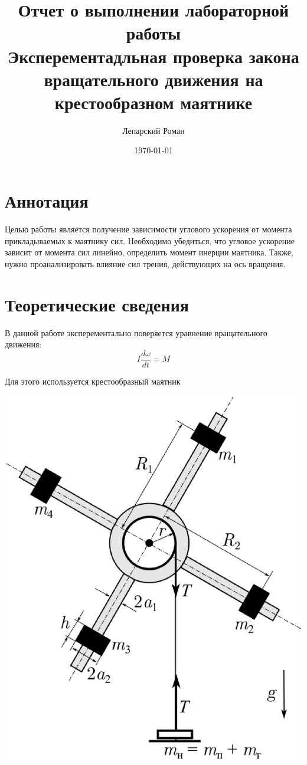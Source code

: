 \documentclass[a4paper, 12pt]{article}
\title{Отчет о выполнении лабораторной работы \\ Эксперементадльная проверка закона вращательного движения на крестообразном маятнике}
\author{Лепарский Роман}
\date{\today}
\begin{document}
\maketitle

\newpage

\section{Аннотация}

Целью работы является получение зависимости углового ускорения от момента прикладываемых к маятнику сил. Необходимо убедиться, что угловое ускорение зависит от момента сил линейно, определить момент инерции маятника. Также, нужно проанализировать влияние сил трения, действующих на ось вращения.

\section{Теоретические сведения}

В данной работе эксперементально поверяется уравнение вращательного движения:
\begin{equation} \label{eq:main}
I\frac{d\omega}{dt} = M
\end{equation}

Для этого используется крестообразный маятник

\begin{center}
\includegraphics[scale = 0.3]{"pendulum.eps"}
\end{center}
\end{document}
